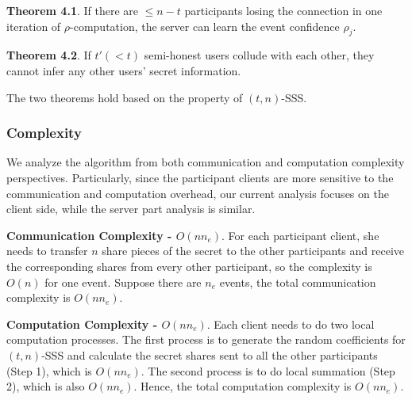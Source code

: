 \textbf{Theorem 4.1}. If there are $\le n-t$ participants losing the connection in one iteration of $\rho$-computation, the server can learn the event confidence $\rho_j$.

\textbf{Theorem 4.2}. If $t' (<t)$ semi-honest users collude with each other, they cannot infer any other users' secret information.

The two theorems hold based on the property of $(t, n)$-SSS.

\subsubsection{Complexity}
We analyze the algorithm from both communication and computation complexity perspectives. Particularly, since the participant clients are more sensitive to the communication and computation overhead, our current analysis focuses on the client side, while the server part analysis is similar.

\textbf{Communication Complexity - $O(nn_e)$}. For each participant client, she needs to transfer $n$ share pieces of the secret to the other participants and receive the corresponding shares from every other participant, so the complexity is $O(n)$ for one event. Suppose there are $n_e$ events, the total communication complexity is $O(nn_e)$.

\textbf{Computation Complexity - $O(nn_e)$}. Each client needs to do two local computation processes. The first process is to generate the random coefficients for $(t,n)$-SSS and calculate the secret shares sent to all the other participants (Step 1), which is $O(nn_e)$. The second process is to do local summation (Step 2), which is also $O(nn_e)$. Hence, the total computation complexity is $O(nn_e)$.
